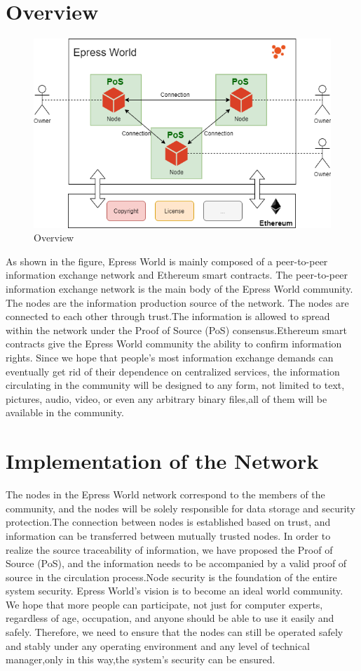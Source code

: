 \documentclass{article}
\begin{document}
\section{Overview}
    \begin{figure}[H]
        \centering
        \includegraphics[width=\textwidth]{figures-overview.png}
        \caption{Overview}
    \end{figure}
    As shown in the figure, Epress World is mainly composed of a peer-to-peer information exchange network and Ethereum smart contracts. The peer-to-peer information exchange network is the main body of the Epress World community. The nodes are the information production source of the network. The nodes are connected to each other through trust.The information is allowed to spread within the network under the Proof of Source (PoS) consensus.Ethereum smart contracts give the Epress World community the ability to confirm information rights. Since we hope that people's most information exchange demands can eventually get rid of their dependence on centralized services, the information circulating in the community will be designed to any form, not limited to text, pictures, audio, video, or even any arbitrary  binary files,all of them  will be available in the community.
\section{Implementation of the Network}
    The nodes in the Epress World network correspond to the members of the community, and the nodes will be solely responsible for data storage and security protection.The connection between nodes is established based on trust, and information can be transferred between mutually trusted nodes. In order to realize the source traceability of information, we have proposed the Proof of Source (PoS), and the information needs to be accompanied by a valid proof of source in the circulation process.Node security is the foundation of the entire system security. Epress World's vision is to become an ideal world community. We hope that more people can participate, not just for computer experts, regardless of age, occupation, and anyone should be able to use it easily and safely. Therefore, we need to ensure that the nodes can still be operated safely and stably under any operating environment and any level of technical  manager,only in this way,the system's security can be ensured.
\end{document}
